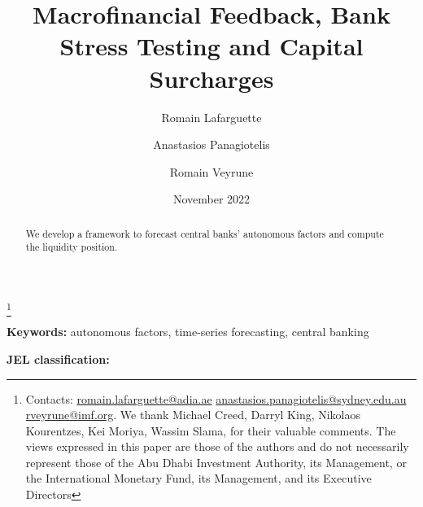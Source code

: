 \documentclass[11pt]{article}
\title{\textbf{Macrofinancial Feedback, Bank Stress Testing and Capital Surcharges}}
\author[$\dag$]{Romain Lafarguette}
\author[$*$]{Anastasios Panagiotelis}
\author[$\S$]{Romain Veyrune}
\affil[$\dag$]{Abu Dhabi Investment Authority}
\affil[$*S$]{University of Sydney}
\affil[$\S$]{International Monetary Fund}
\date{November 2022}
\newcommand\blfootnote[1]{%
  \begingroup
  \renewcommand\thefootnote{}\footnote{#1}%
  \addtocounter{footnote}{-1}%
  \endgroup
}
\begin{document}
\maketitle
\blfootnote{Contacts: \url{romain.lafarguette@adia.ae} \url{anastasios.panagiotelis@sydney.edu.au} \url{rveyrune@imf.org}. We thank Michael Creed, Darryl King, Nikolaos Kourentzes, Kei Moriya, Wassim Slama, for their valuable comments. The views expressed in this paper are those of the authors and do not necessarily represent those of the Abu Dhabi Investment Authority, its Management, or the International Monetary Fund, its Management, and its Executive Directors} 


\begin{abstract}
\noindent We develop a framework to forecast central banks' autonomous factors and compute the liquidity position.  
\end{abstract}
\bigskip

\noindent \textbf{Keywords:} autonomous factors, time-series forecasting, central banking

\medskip

\noindent \textbf{JEL classification:} 

\thispagestyle{empty} 
\newpage
{}



\newpage
\singlespacing



\newpage
%

\end{document}
